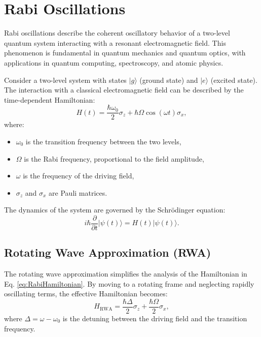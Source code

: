 
\section{Rabi Oscillations}

Rabi oscillations describe the coherent oscillatory behavior of a two-level quantum system interacting with a resonant electromagnetic field. This phenomenon is fundamental in quantum mechanics and quantum optics, with applications in quantum computing, spectroscopy, and atomic physics.

Consider a two-level system with states \(|g\rangle\) (ground state) and \(|e\rangle\) (excited state). The interaction with a classical electromagnetic field can be described by the time-dependent Hamiltonian:
\begin{equation}
	H(t) = \frac{\hbar \omega_0}{2} \sigma_z + \hbar \Omega \cos(\omega t) \sigma_x,
	\label{eq:RabiHamiltonian}
\end{equation}
where:
\begin{itemize}
	\item \(\omega_0\) is the transition frequency between the two levels,
	\item \(\Omega\) is the Rabi frequency, proportional to the field amplitude,
	\item \(\omega\) is the frequency of the driving field,
	\item \(\sigma_z\) and \(\sigma_x\) are Pauli matrices.
\end{itemize}

The dynamics of the system are governed by the Schrödinger equation:
\begin{equation}
	i\hbar \frac{\partial}{\partial t} |\psi(t)\rangle = H(t) |\psi(t)\rangle.
	\label{eq:Schrodinger}
\end{equation}


\subsection{Rotating Wave Approximation (RWA)}

The rotating wave approximation simplifies the analysis of the Hamiltonian in Eq. \eqref{eq:RabiHamiltonian}. By moving to a rotating frame and neglecting rapidly oscillating terms, the effective Hamiltonian becomes:
\begin{equation}
	H_{\text{RWA}} = \frac{\hbar \Delta}{2} \sigma_z + \frac{\hbar \Omega}{2} \sigma_x,
	\label{eq:RWAHamiltonian}
\end{equation}
where \(\Delta = \omega - \omega_0\) is the detuning between the driving field and the transition frequency.

